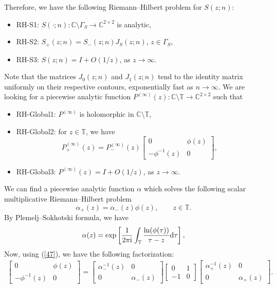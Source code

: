 \documentclass[pdftex]{sigma}
\numberwithin{equation}{section}
\newcommand{\C}{{\mathbb C}}
\newcommand{\T}{{\mathbb T}}
\newcommand{\al}{\alpha}
\newcommand{\Ga}{\Gamma}
\begin{document}
		Therefore, we have the following Riemann--Hilbert problem for $S(z;n)$:
		\begin{itemize}\itemsep=0pt
			\item {\rm RH-S1:} $ S(\cdot;n)\colon\C\setminus \Ga_S \to \C^{2\times2}$ is analytic,
			\item {\rm RH-S2:} $S_{+}(z;n)=S_{-}(z;n) J_{S}(z;n)$, $z \in \Ga_S$,
			\item {\rm RH-S3:} $ S(z;n)=I+O(1/z)$, as $z \to \infty$.
		\end{itemize}
		Note that the matrices $J_0(z;n)$ and $J_1(z;n)$ tend to the identity matrix uniformly on their respective contours, exponentially fast as $n \to \infty$.	We are looking for a piecewise analytic function $P^{(\infty)}(z)\colon \C \setminus \T \to \C^{2\times2}$ such that
\begin{itemize}\itemsep=0pt
			\item {\rm RH-Global1:} $P^{(\infty)}$ is holomorphic in $\C \setminus \T$,
			\item {\rm RH-Global2:} for $z\in \T$, we have \begin{equation}\label{44}
				P_+^{(\infty)}(z)=P_-^{(\infty)}(z) \begin{bmatrix}
					0 & \phi(z) \\
					- \phi^{-1}(z) & 0
				\end{bmatrix},
			\end{equation}
			\item {\rm RH-Global3:} $P^{(\infty)}(z)=I+O(1/z)$, as $z \to \infty$.
		\end{itemize}
		We can find a piecewise analytic function $\al$ which solves the following scalar multiplicative Riemann--Hilbert problem \begin{equation}\label{47}
			\al_+(z)=\al_-(z)\phi(z), \qquad z \in \T.
		\end{equation}
		By Plemelj--Sokhotski formula, we have \begin{equation}\label{45}
			\al(z)=\exp \left[ \frac{1}{2 \pi {\rm i} } \int_{\T} \frac{\ln(\phi(\tau))}{\tau-z}{\rm d}\tau \right],
		\end{equation}
		Now, using (\ref{47}), we have the following factorization: \begin{gather*}%
			\begin{bmatrix}
				0 & \phi(z) \\
				- \phi^{-1}(z) & 0
			\end{bmatrix}= \begin{bmatrix}
				\al_-^{-1}(z) & 0 \\
				0 & \al_-(z)
			\end{bmatrix} \begin{bmatrix}
				0 & 1 \\
				- 1 & 0
			\end{bmatrix} \begin{bmatrix}
				\al^{-1}_+(z) & 0 \\
				0 & \al_+(z)
			\end{bmatrix}.
		\end{gather*}
\end{document}
